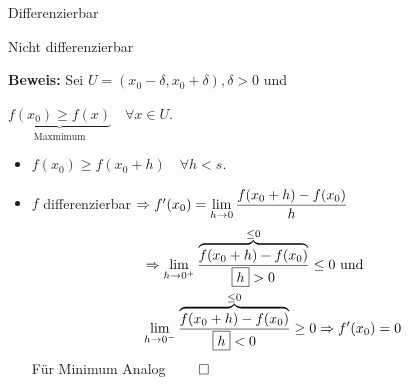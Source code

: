 \documentclass[10pt, a4paper, fleqn]{article}
\begin{document}
\begin{minipage}{0.5\textwidth}
    \begin{center}

        Differenzierbar  
    \end{center}
\end{minipage}
\begin{minipage}{0.5\textwidth}
    \begin{center}

        Nicht differenzierbar
    \end{center}
\end{minipage}
\bigskip

\textbf{Beweis: } Sei $U = (x_0 - \delta , x_0 + \delta), \delta > 0$ und

$\underbrace{f(x_0) \geq f(x)}_{\text{Maxmimum}} \quad \forall x \in U$.
\begin{itemize}
    \item $f(x_0) \geq f(x_0 + h) \quad \forall h < s$.
    \item $f$ differenzierbar $\Rightarrow f'(x_0) = \lim\limits_{h \to 0} \dfrac{f(x_0 + h) - f(x_0)}{h}$
    \[\begin{aligned}
        &\Rightarrow \lim_{h \to 0^+} \frac{\overbrace{f(x_0 + h) - f(x_0)}^{\leq 0}}{\boxed{h} > 0} \leq 0 \text{ und } \\
        &\lim_{h \to 0^-} \frac{\overbrace{f(x_0 + h) - f(x_0)}^{\leq 0}}{\boxed{h} < 0} \geq 0 \Rightarrow f'(x_0) = 0
    \end{aligned}\]
    Für Minimum Analog $\qed$
\end{itemize}
\end{document}
